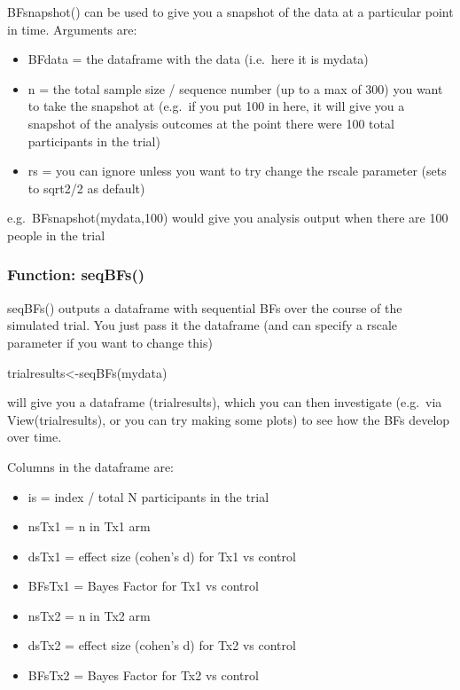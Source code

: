 \documentclass[
]{book}
\providecommand{\tightlist}{%
  \setlength{\itemsep}{0pt}\setlength{\parskip}{0pt}}
\begin{document}
BFsnapshot() can be used to give you a snapshot of the data at a particular point in time. Arguments are:

\begin{itemize}
\tightlist
\item
  BFdata = the dataframe with the data (i.e.~here it is mydata)
\item
  n = the total sample size / sequence number (up to a max of 300) you want to take the snapshot at (e.g.~if you put 100 in here, it will give you a snapshot of the analysis outcomes at the point there were 100 total participants in the trial)
\item
  rs = you can ignore unless you want to try change the rscale parameter (sets to sqrt2/2 as default)
\end{itemize}

e.g.~BFsnapshot(mydata,100) would give you analysis output when there are 100 people in the trial

\hypertarget{function-seqbfs}{%
\subsubsection{Function: seqBFs()}\label{function-seqbfs}}

seqBFs() outputs a dataframe with sequential BFs over the course of the simulated trial. You just pass it the dataframe (and can specify a rscale parameter if you want to change this)

trialresults\textless-seqBFs(mydata)

will give you a dataframe (trialresults), which you can then investigate (e.g.~via View(trialresults), or you can try making some plots) to see how the BFs develop over time.

Columns in the dataframe are:

\begin{itemize}
\tightlist
\item
  is = index / total N participants in the trial
\item
  nsTx1 = n in Tx1 arm
\item
  dsTx1 = effect size (cohen's d) for Tx1 vs control
\item
  BFsTx1 = Bayes Factor for Tx1 vs control
\item
  nsTx2 = n in Tx2 arm
\item
  dsTx2 = effect size (cohen's d) for Tx2 vs control
\item
  BFsTx2 = Bayes Factor for Tx2 vs control
\end{itemize}
\end{document}
